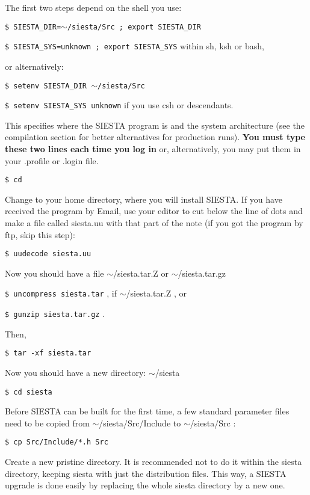 The first two steps depend on the shell you use:

{\tt \$ SIESTA\_DIR=$\sim$/siesta/Src ; 
export SIESTA\_DIR}

{\tt \$ SIESTA\_SYS=unknown ; 
      export SIESTA\_SYS}
\hspace{1cm} within sh, ksh or bash,

\noindent
or alternatively: 

\vspace{1pt}
{\tt \$ setenv SIESTA\_DIR $\sim$/siesta/Src}

{\tt \$ setenv SIESTA\_SYS unknown}
\hspace{2.5cm} if you use csh or descendants.

\noindent
This specifies where the SIESTA program is and  
the system architecture (see the compilation section for
better alternatives for production runs). {\bf You must type these two lines
each time you log in} or, alternatively, you may put them
in your .profile or .login file.

{\tt \$ cd}

\noindent
Change to your home directory, where you will install SIESTA.
If you have received the program by Email, use your editor to
cut below the line of dots and make a file called siesta.uu
with that part of the note (if you got the program by ftp,
skip this step):

{\tt \$ uudecode siesta.uu}

\noindent
Now you should have a file $\sim$/siesta.tar.Z or $\sim$/siesta.tar.gz

{\tt \$ uncompress siesta.tar} , if $\sim$/siesta.tar.Z , or

{\tt \$ gunzip siesta.tar.gz} . 

\noindent
Then,

{\tt \$ tar -xf siesta.tar}

\noindent
Now you should have a new directory: $\sim$/siesta

{\tt \$ cd siesta}

Before SIESTA can be built for the first time, a few 
standard parameter files need to be copied 
from $\sim$/siesta/Src/Include to $\sim$/siesta/Src :

{\tt \$ cp Src/Include/*.h Src}

Create a new pristine directory. It is recommended not to
do it within the siesta directory, keeping siesta with just
the distribution files. This way, a SIESTA upgrade is done
easily by replacing the whole siesta directory by a new one.

